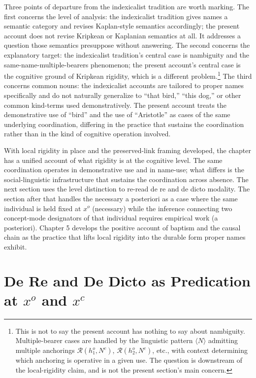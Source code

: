\documentclass[10pt]{article}
\begin{document}
Three points of departure from the indexicalist tradition are worth marking. The first concerns the level of analysis: the indexicalist tradition gives names a semantic category and revises Kaplan-style semantics accordingly; the present account does not revise Kripkean or Kaplanian semantics at all. It addresses a question those semantics presuppose without answering. The second concerns the explanatory target: the indexicalist tradition's central case is nambiguity and the same-name-multiple-bearers phenomenon; the present account's central case is the cognitive ground of Kripkean rigidity, which is a different problem.\footnote{This is not to say the present account has nothing to say about nambiguity. Multiple-bearer cases are handled by the linguistic pattern \(\langle N \rangle\) admitting multiple anchorings \(\mathcal{R}(h_1^o, N^c)\), \(\mathcal{R}(h_2^o, N^c)\), etc., with context determining which anchoring is operative in a given use. The question is downstream of the local-rigidity claim, and is not the present section's main concern.} The third concerns common nouns: the indexicalist accounts are tailored to proper names specifically and do not naturally generalize to ``that bird,'' ``this dog,'' or other common kind-terms used demonstratively. The present account treats the demonstrative use of ``bird'' and the use of ``Aristotle'' as cases of the same underlying coordination, differing in the practice that sustains the coordination rather than in the kind of cognitive operation involved.

With local rigidity in place and the preserved-link framing developed, the chapter has a unified account of what rigidity is at the cognitive level. The same coordination operates in demonstrative use and in name-use; what differs is the social-linguistic infrastructure that sustains the coordination across absence. The next section uses the level distinction to re-read de re and de dicto modality. The section after that handles the necessary a posteriori as a case where the same individual is held fixed at \(x^o\) (necessary) while the inference connecting two concept-mode designators of that individual requires empirical work (a posteriori). Chapter 5 develops the positive account of baptism and the causal chain as the practice that lifts local rigidity into the durable form proper names exhibit.

\section{\texorpdfstring{De Re and De Dicto as Predication at \(x^o\) and \(x^c\)}{De Re and De Dicto as Predication at x\^{}o and x\^{}c}}\label{de-re-and-de-dicto-as-predication-at-xo-and-xc}
\end{document}
